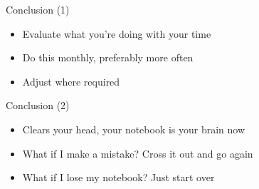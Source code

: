 \documentclass[aspectratio=169]{beamer}
\begin{document}
    {
    \begin{frame}{Conclusion (1)}
        \begin{itemize}
            \item Evaluate what you're doing with your time
            \item Do this monthly, preferably more often
            \item Adjust where required
        \end{itemize}
    \end{frame}
    }

    {
    \begin{frame}{Conclusion (2)}
        \begin{itemize}
            \item Clears your head, your notebook is your brain now
            \item What if I make a mistake? Cross it out and go again
            \item What if I lose my notebook? Just start over
        \end{itemize}
    \end{frame}
    }
\end{document}
